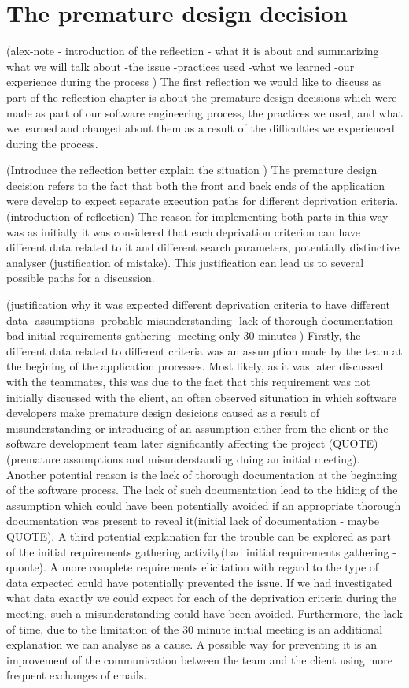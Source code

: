 \documentclass{l3proj}
\begin{document}
\section{The premature design decision}
\label{design}

(alex-note - introduction of the reflection - what it is about and summarizing what we will talk about
-the issue
-practices used
-what we learned
-our experience during the process
)
The first reflection we would like to discuss as part of the reflection chapter is about the premature design decisions which were made as part of our software engineering process, the practices we used, and what we learned and changed about them as a result of the difficulties we experienced during the process.

(Introduce the reflection better explain the situation )
The premature design decision refers to the fact that both the front and back ends of the application were develop to expect separate execution paths for different deprivation criteria.(introduction of reflection) The reason for implementing both parts in this way was as initially it was considered that each deprivation criterion can have different data related to it and different search parameters, potentially distinctive analyser (justification of mistake). This justification can lead us to several possible paths for a  discussion.

(justification why  it was expected different deprivation criteria to have different data
-assumptions
-probable misunderstanding
-lack of thorough documentation
-bad initial requirements gathering
-meeting only 30 minutes
)
Firstly, the different data related to different criteria was an assumption made by the team at the begining of the application processes. Most likely, as it was later discussed with the teammates, this was due to the fact that this requirement was not initially discussed with the client, an often observed situnation in which software developers make premature design desicions caused as a result of misunderstanding or introducing of an assumption either from the client or the software development team later significantly affecting the project (QUOTE)(premature assumptions and misunderstanding duing an initial meeting). Another potential reason is the lack of thorough documentation at the beginning of the software process. The lack of such documentation lead to the hiding of the assumption which could have been potentially avoided if an appropriate thorough documentation was present to reveal it(initial lack of documentation - maybe QUOTE). A third potential explanation for the trouble can be explored as part of the initial requirements gathering activity(bad initial requirements gathering - quoute). A more complete requirements elicitation with regard to the type of data expected could have potentially prevented the issue. If we had investigated what data exactly we could expect for each of the deprivation criteria during the meeting, such a misunderstanding could have been avoided. Furthermore, the lack of time, due to the limitation of the 30 minute initial meeting is an additional explanation we can analyse as a cause. A possible way for preventing it is an improvement of the communication between the team and the client using more frequent exchanges of emails.
\end{document}
